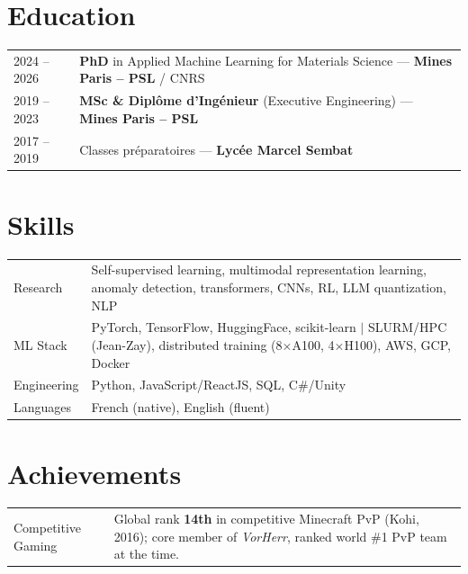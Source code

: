 \documentclass[a4paper,11pt]{article}
\begin{document}
\section{Education}
\begin{tabularx}{\linewidth}{@{}l X@{}}
2024 -- 2026 & \textbf{PhD} in Applied Machine Learning for Materials Science --- \textbf{Mines Paris -- PSL} / CNRS \\[-2pt]
2019 -- 2023 & \textbf{MSc \& Diplôme d'Ingénieur} (Executive Engineering) --- \textbf{Mines Paris -- PSL} \\[-2pt]
2017 -- 2019 & Classes préparatoires --- \textbf{Lycée Marcel Sembat} \\
\end{tabularx}

\section{Skills}
\begin{tabularx}{\linewidth}{@{}l X@{}}
Research        & \small{Self-supervised learning, multimodal representation learning, anomaly detection, transformers, CNNs, RL, LLM quantization, NLP} \\[-2pt]
ML Stack        & \small{PyTorch, TensorFlow, HuggingFace, scikit-learn $|$ SLURM/HPC (Jean-Zay), distributed training (8$\times$A100, 4$\times$H100), AWS, GCP, Docker} \\[-2pt]
Engineering     & \small{Python, JavaScript/ReactJS, SQL, C\#/Unity} \\[-2pt]
Languages       & \small{French (native), English (fluent)} \\
\end{tabularx}

\section{Achievements}
\begin{tabularx}{\linewidth}{@{}l X@{}}
Competitive Gaming & \small{Global rank \textbf{14th} in competitive Minecraft PvP (Kohi, 2016); core member of \textit{VorHerr}, ranked world \#1 PvP team at the time.} \\
\end{tabularx}
\end{document}
